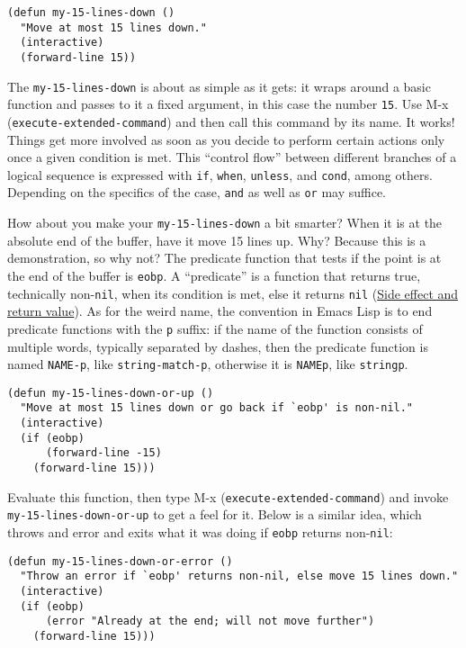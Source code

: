 \documentclass[11pt]{ctexart}
\begin{document}
\begin{verbatim}
(defun my-15-lines-down ()
  "Move at most 15 lines down."
  (interactive)
  (forward-line 15))
\end{verbatim}

The \texttt{my-15-lines-down} is about as simple as it gets: it wraps around a basic function and passes to it a fixed argument, in this case the number \texttt{15}. Use M-x (\texttt{execute-extended-command}) and then call this command by its name. It works! Things get more involved as soon as you decide to perform certain actions only once a given condition is met. This ``control flow'' between different branches of a logical sequence is expressed with \texttt{if}, \texttt{when}, \texttt{unless}, and \texttt{cond}, among others. Depending on the specifics of the case, \texttt{and} as well as \texttt{or} may suffice.

How about you make your \texttt{my-15-lines-down} a bit smarter? When it is at the absolute end of the buffer, have it move 15 lines up. Why? Because this is a demonstration, so why not? The predicate function that tests if the point is at the end of the buffer is \texttt{eobp}. A ``predicate'' is a function that returns true, technically non-\texttt{nil}, when its condition is met, else it returns \texttt{nil} (\hyperref[sec:org2689823]{Side effect and return value}). As for the weird name, the convention in Emacs Lisp is to end predicate functions with the \texttt{p} suffix: if the name of the function consists of multiple words, typically separated by dashes, then the predicate function is named \texttt{NAME-p}, like \texttt{string-match-p}, otherwise it is \texttt{NAMEp}, like \texttt{stringp}.

\begin{verbatim}
(defun my-15-lines-down-or-up ()
  "Move at most 15 lines down or go back if `eobp' is non-nil."
  (interactive)
  (if (eobp)
      (forward-line -15)
    (forward-line 15)))
\end{verbatim}

Evaluate this function, then type M-x (\texttt{execute-extended-command}) and invoke \texttt{my-15-lines-down-or-up} to get a feel for it. Below is a similar idea, which throws and error and exits what it was doing if \texttt{eobp} returns non-\texttt{nil}:

\begin{verbatim}
(defun my-15-lines-down-or-error ()
  "Throw an error if `eobp' returns non-nil, else move 15 lines down."
  (interactive)
  (if (eobp)
      (error "Already at the end; will not move further")
    (forward-line 15)))
\end{verbatim}
\end{document}
